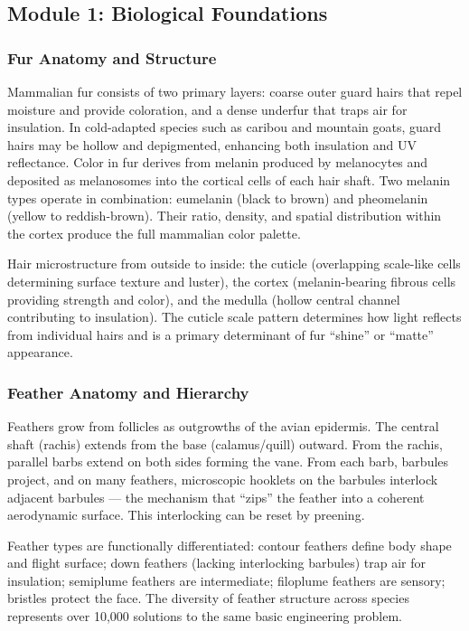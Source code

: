 \documentclass[11pt,letterpaper]{article}
\begin{document}
\subsection{Module 1: Biological Foundations}

\subsubsection{Fur Anatomy and Structure}

Mammalian fur consists of two primary layers: coarse outer guard hairs that repel moisture and provide coloration, and a dense underfur that traps air for insulation. In cold-adapted species such as caribou and mountain goats, guard hairs may be hollow and depigmented, enhancing both insulation and UV reflectance. Color in fur derives from melanin produced by melanocytes and deposited as melanosomes into the cortical cells of each hair shaft. Two melanin types operate in combination: eumelanin (black to brown) and pheomelanin (yellow to reddish-brown). Their ratio, density, and spatial distribution within the cortex produce the full mammalian color palette.

Hair microstructure from outside to inside: the cuticle (overlapping scale-like cells determining surface texture and luster), the cortex (melanin-bearing fibrous cells providing strength and color), and the medulla (hollow central channel contributing to insulation). The cuticle scale pattern determines how light reflects from individual hairs and is a primary determinant of fur ``shine'' or ``matte'' appearance.

\subsubsection{Feather Anatomy and Hierarchy}

Feathers grow from follicles as outgrowths of the avian epidermis. The central shaft (rachis) extends from the base (calamus/quill) outward. From the rachis, parallel barbs extend on both sides forming the vane. From each barb, barbules project, and on many feathers, microscopic hooklets on the barbules interlock adjacent barbules --- the mechanism that ``zips'' the feather into a coherent aerodynamic surface. This interlocking can be reset by preening.

Feather types are functionally differentiated: contour feathers define body shape and flight surface; down feathers (lacking interlocking barbules) trap air for insulation; semiplume feathers are intermediate; filoplume feathers are sensory; bristles protect the face. The diversity of feather structure across species represents over 10,000 solutions to the same basic engineering problem.
\end{document}

